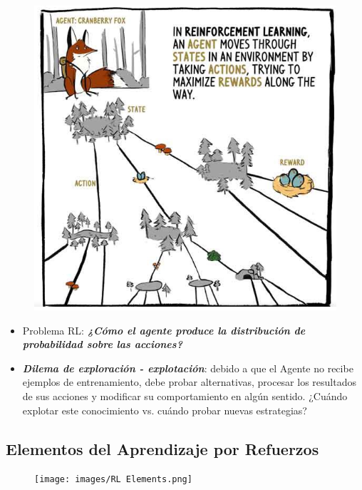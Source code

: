 \documentclass[11pt]{article}
\makeatletter
\def\maxwidth{\ifdim\Gin@nat@width>\linewidth\linewidth
    \else\Gin@nat@width\fi}
\let\Oldincludegraphics\includegraphics
\renewcommand{\includegraphics}[1]{\Oldincludegraphics[width=.8\maxwidth]{#1}}
\makeatother
\begin{document}
\begin{figure}
\centering
\includegraphics{images/fox-rl.png}
\caption{}
\end{figure}

\begin{itemize}
\item
  Problema RL: \textbf{\emph{¿Cómo el agente produce la distribución de
  probabilidad sobre las acciones?}}
\item
  \textbf{\emph{Dilema de exploración - explotación}}: debido a que el
  Agente no recibe ejemplos de entrenamiento, debe probar alternativas,
  procesar los resultados de sus acciones y modificar su comportamiento
  en algún sentido. ¿Cuándo explotar este conocimiento vs. cuándo probar
  nuevas estrategias?
\end{itemize}

    \subsection{Elementos del Aprendizaje por
Refuerzos}\label{elementos-del-aprendizaje-por-refuerzos}

\begin{figure}
\centering
\texttt{[image: images/RL Elements.png]}
\caption{}
\end{figure}
\end{document}
